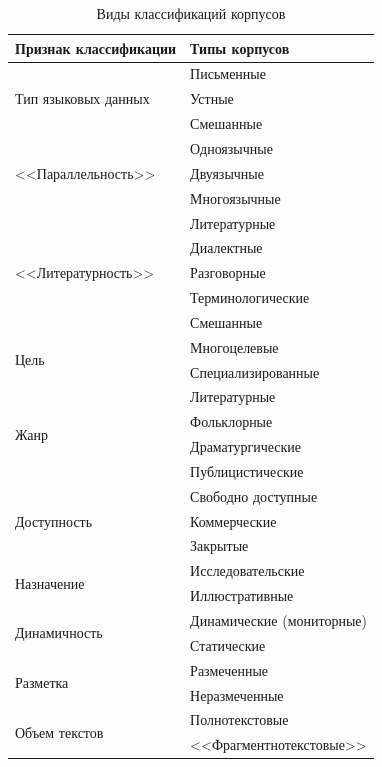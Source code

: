 \begin{table}[H]
	\centering
	\caption{Виды классификаций корпусов}
	\begin{tabular}{|l|l|}
		\hline 
		Признак классификации & Типы корпусов \\
		\hline
		\multirow{3}{*}{Тип языковых данных} & Письменные \\\cline{2-2} 
		 & Устные \\\cline{2-2}
		 & Смешанные \\\hline
		\multirow{3}{*}{<<Параллельность>>} & Одноязычные \\\cline{2-2}
		 & Двуязычные \\\cline{2-2}
		 & Многоязычные \\\hline
		 \multirow{5}{*}{<<Литературность>>} & Литературные \\\cline{2-2}
		 & Диалектные \\\cline{2-2}
		 & Разговорные \\\cline{2-2}
		 & Терминологические \\\cline{2-2}
		 & Смешанные \\\hline
		\multirow{2}{*}{Цель} & Многоцелевые \\\cline{2-2}
		 & Специализированные \\\hline
		\multirow{4}{*}{Жанр}&Литературные\\\cline{2-2}
		 &Фольклорные\\\cline{2-2}
		 &Драматургические\\\cline{2-2}
		 &Публицистические\\\hline
		\multirow{3}{*}{Доступность}&Свободно доступные\\\cline{2-2}
		 &Коммерческие\\\cline{2-2}
		 &Закрытые\\\hline
		\multirow{2}{*}{Назначение}&Исследовательские\\\cline{2-2}
		 &Иллюстративные\\\hline
		\multirow{2}{*}{Динамичность}&Динамические (мониторные)\\\cline{2-2}
		 &Статические\\\hline
		\multirow{2}{*}{Разметка}&Размеченные\\\cline{2-2}
		 &Неразмеченные\\\hline
		\multirow{2}{*}{Объем текстов}&Полнотекстовые\\\cline{2-2}
		&<<Фрагментнотекстовые>>\\\hline
	\end{tabular}
	\label{tab:classification_1}
\end{table}

